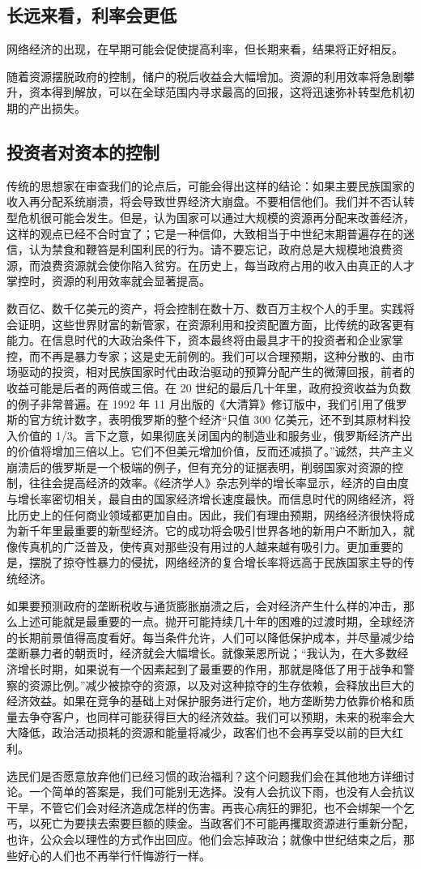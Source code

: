 \subsection{长远来看，利率会更低}
网络经济的出现，在早期可能会促使提高利率，但长期来看，结果将正好相反。

随着资源摆脱政府的控制，储户的税后收益会大幅增加。资源的利用效率将急剧攀升，资本得到解放，可以在全球范围内寻求最高的回报，这将迅速弥补转型危机初期的产出损失。

\subsection{投资者对资本的控制}
传统的思想家在审查我们的论点后，可能会得出这样的结论：如果主要民族国家的收入再分配系统崩溃，将会导致世界经济大崩盘。不要相信他们。我们并不否认转型危机很可能会发生。但是，认为国家可以通过大规模的资源再分配来改善经济，这样的观点已经不合时宜了；它是一种信仰，大致相当于中世纪末期普遍存在的迷信，认为禁食和鞭笞是利国利民的行为。请不要忘记，政府总是大规模地浪费资源，而浪费资源就会使你陷入贫穷。在历史上，每当政府占用的收入由真正的人才掌控时，资源的利用效率就会显著提高。

数百亿、数千亿美元的资产，将会控制在数十万、数百万主权个人的手里。实践将会证明，这些世界财富的新管家，在资源利用和投资配置方面，比传统的政客更有能力。在信息时代的大政治条件下，资本最终将由最具才干的投资者和企业家掌控，而不再是暴力专家；这是史无前例的。我们可以合理预期，这种分散的、由市场驱动的投资，相对民族国家时代由政治驱动的预算分配产生的微薄回报，前者的收益可能是后者的两倍或三倍。在 20 世纪的最后几十年里，政府投资收益为负数的例子非常普遍。在 1992 年 11 月出版的《大清算》修订版中，我们引用了俄罗斯的官方统计数字，表明俄罗斯的整个经济“只值 300 亿美元，还不到其原材料投入价值的 1/3。言下之意，如果彻底关闭国内的制造业和服务业，俄罗斯经济产出的价值将增加三倍以上。它们不但美元增加价值，反而还减损了。”诚然，共产主义崩溃后的俄罗斯是一个极端的例子，但有充分的证据表明，削弱国家对资源的控制，往往会提高经济的效率。《经济学人》杂志列举的增长率显示，经济的自由度与增长率密切相关，最自由的国家经济增长速度最快。而信息时代的网络经济，将比历史上的任何商业领域都更加自由。因此，我们有理由预期，网络经济很快将成为新千年里最重要的新型经济。它的成功将会吸引世界各地的新用户不断加入，就像传真机的广泛普及，使传真对那些没有用过的人越来越有吸引力。更加重要的是，摆脱了掠夺性暴力的侵扰，网络经济的复合增长率将远高于民族国家主导的传统经济。

如果要预测政府的垄断税收与通货膨胀崩溃之后，会对经济产生什么样的冲击，那么上述可能就是最重要的一点。抛开可能持续几十年的困难的过渡时期，全球经济的长期前景值得高度看好。每当条件允许，人们可以降低保护成本，并尽量减少给垄断暴力者的朝贡时，经济就会大幅增长。就像莱恩所说；“我认为，在大多数经济增长时期，如果说有一个因素起到了最重要的作用，那就是降低了用于战争和警察的资源比例。”减少被掠夺的资源，以及对这种掠夺的生存依赖，会释放出巨大的经济效益。如果在竞争的基础上对保护服务进行定价，地方垄断势力依靠价格和质量去争夺客户，也同样可能获得巨大的经济效益。我们可以预期，未来的税率会大大降低，政治活动损耗的资源和能量将减少，政客们也不会再享受以前的巨大红利。

选民们是否愿意放弃他们已经习惯的政治福利？这个问题我们会在其他地方详细讨论。一个简单的答案是，我们可能别无选择。没有人会抗议下雨，也没有人会抗议干旱，不管它们会对经济造成怎样的伤害。再丧心病狂的罪犯，也不会绑架一个乞丐，以死亡为要挟去索要巨额的赎金。当政客们不可能再攫取资源进行重新分配，也许，公众会以理性的方式作出回应。他们会忘掉政治；就像中世纪结束之后，那些好心的人们也不再举行忏悔游行一样。